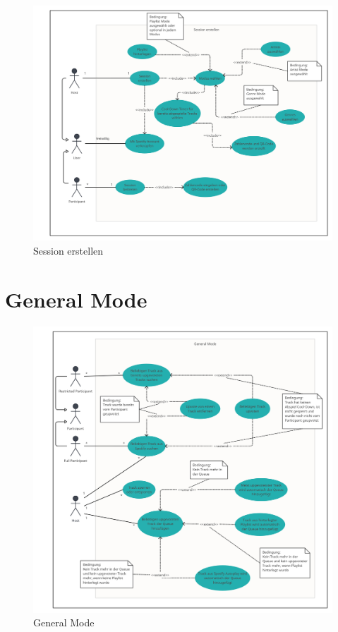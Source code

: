 \documentclass[oneside, ngerman]{sdqtechreport}
\begin{document}
\begin{figure}[h]
    \includegraphics[width = 16cm]{LATEX/Pflichtenheft/GraphicDesigns/Use Case Session erstellen.png}
    \caption{Session erstellen}
    \label{fig:Use Case App Start}
\end{figure}

\newpage

\section{General Mode}
\label{sec:Anwendungsfälle:General Mode}
\hypertarget{General Mode}{}

\begin{figure}[h]
    \includegraphics[width = 16cm]{LATEX/Pflichtenheft/GraphicDesigns/Use Case General Mode.png}
    \caption{General Mode}
    \label{fig:Use Case General Mode}
\end{figure}
\end{document}
